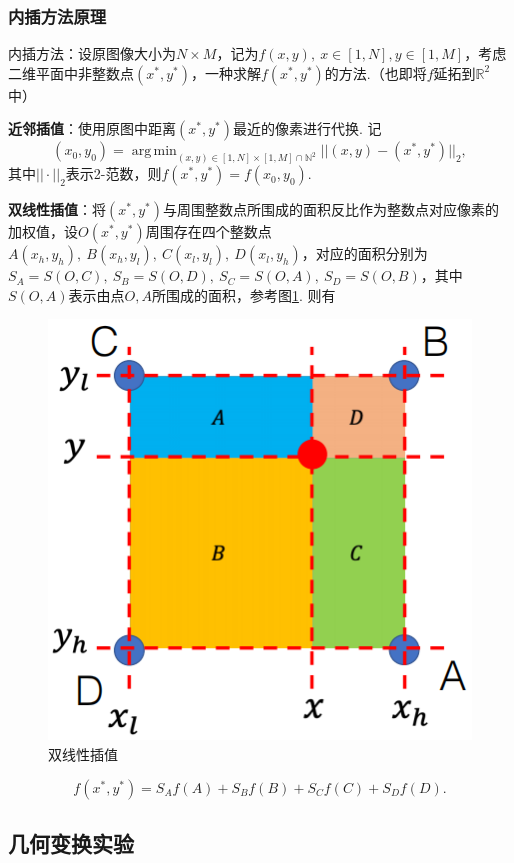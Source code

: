 \documentclass[12pt, a4paper, oneside]{ctexart}
\numberwithin{equation}{section}  %
\DeclareMathOperator*{\argmax}{arg\,max}  %
\DeclareMathOperator*{\argmin}{arg\,min}  %
\def\R{\mathbb{R}}          %
\def\N{\mathbb{N}}          %
\def\del{\vspace{-1.5ex}}   %
\begin{document}
\subsubsection{内插方法原理}
内插方法：设原图像大小为$N\times M$，记为$f(x,y),\ x\in[1,N],y\in[1,M]$，考虑二维平面中非整数点$(x^*, y^*)$，一种求解$f(x^*,y^*)$的方法.（也即将$f$延拓到$\R^2$中）

\textbf{近邻插值}：使用原图中距离$(x^*,y^*)$最近的像素进行代换. 记\del
\begin{equation*}
 (x_0,y_0) = \argmin_{(x,y)\in[1,N]\times[1,M]\cap \N^2}||(x,y)-(x^*,y^*)||_2,
\end{equation*}
其中$||\cdot||_2$表示2-范数，则$f(x^*,y^*) = f(x_0,y_0)$.

\textbf{双线性插值}：将$(x^*,y^*)$与周围整数点所围成的面积反比作为整数点对应像素的加权值，设$O(x^*,y^*)$周围存在四个整数点$A(x_h, y_h),\ B(x_h, y_l),\ C(x_l, y_l),\ D(x_l, y_h)$，对应的面积分别为$S_A = S(O,C),\ S_B = S(O, D),\ S_C = S(O, A),\ S_D = S(O, B)$，其中$S(O,A)$表示由点$O,A$所围成的面积，参考图\ref{双线性插值}. 则有\del\del

{\begin{figure} %
    \centering
    \includegraphics[scale=1.2]{双线性插值.png}
    \caption{双线性插值}
    \label{双线性插值}
\end{figure}
\begin{equation*}
    f(x^*, y^*) = S_Af(A)+S_Bf(B)+S_Cf(C)+S_Df(D).
\end{equation*}}
\vspace{2cm}\subsection{几何变换实验}
\end{document}

